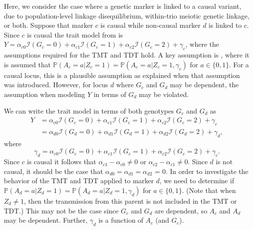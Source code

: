 \documentclass[12pt]{extarticle}
\newcommand{\pp}{\mathbb{P}}
\newcommand{\indicator}{\mathcal{I}}
\begin{document}
{%
%

%

Here, we consider the case where a genetic marker is linked to a causal variant, due to population-level linkage disequilibrium, within-trio meiotic genetic linkage, or both. Suppose that marker $c$ is causal while non-causal marker $d$ is linked to $c$. Since $c$ is causal the trait model from  is $Y = \alpha_{c0} \indicator(G_c=0) + \alpha_{c1} \indicator(G_c=1) + \alpha_{c2} \indicator(G_c=2) + \gamma_c$, where the assumptions required for the TMT and TDT hold. A key assumption is , where it is assumed that $\pp(A_c = a | Z_c = 1) = \pp(A_c = a | Z_c = 1, \gamma_c)$ for $a \in \{0,1\}$. For a causal locus, this is a plausible assumption as explained when that assumption was introduced. However, for locus $d$ where $G_c$ and $G_d$ may be dependent, the assumption when modeling $Y$ in terms of $G_d$ may be violated. 

We can write the trait model in terms of both genotypes $G_c$ and $G_d$ as
\begin{align*}
Y & = \alpha_{c0} \indicator(G_c=0) + \alpha_{c1} \indicator(G_c=1) + \alpha_{c2} \indicator(G_c=2) + \gamma_c \\
  & = \alpha_{d0} \indicator(G_d=0) + \alpha_{d1} \indicator(G_d=1) + \alpha_{d2} \indicator(G_d=2) + \gamma_d,
\end{align*} where
\begin{equation*}
\gamma_d = \alpha_{c0} \indicator(G_c=0) + \alpha_{c1} \indicator(G_c=1) + \alpha_{c2} \indicator(G_c=2) + \gamma_c.
\end{equation*}
Since $c$ is causal it follows that $\alpha_{c1} - \alpha_{c0} \not= 0$ or $\alpha_{c2} - \alpha_{c1} \not= 0$. Since $d$ is not causal, it should be the case that $\alpha_{d0} = \alpha_{d1} = \alpha_{d2}$ = 0. In order to investigate the behavior of the TMT and TDT applied to marker $d$, we need to determine if $\pp(A_d = a | Z_d = 1) = \pp(A_d = a | Z_d = 1, \gamma_d)$ for $a \in \{0,1\}$. (Note that when $Z_d \not= 1$, then the transmission from this parent is not included in the TMT or TDT.) This may not be the case since $G_c$ and $G_d$ are dependent, so $A_c$ and $A_d$ may be dependent. Further, $\gamma_d$ is a function of $A_c$ (and $G_c$). 

}
\end{document}
